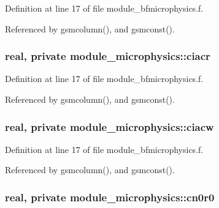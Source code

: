 Definition at line 17 of file module\+\_\+bfmicrophysics.\+f.



Referenced by gsmcolumn(), and gsmconst().

\subsubsection[{\texorpdfstring{ciacr}{ciacr}}]{\setlength{\rightskip}{0pt plus 5cm}real, private module\+\_\+microphysics\+::ciacr\hspace{0.3cm}{\ttfamily [private]}}\hypertarget{namespacemodule__microphysics_a1c6192a9baafa2b341b19628e00c19b5}{}\label{namespacemodule__microphysics_a1c6192a9baafa2b341b19628e00c19b5}


Definition at line 17 of file module\+\_\+bfmicrophysics.\+f.



Referenced by gsmcolumn(), and gsmconst().

\subsubsection[{\texorpdfstring{ciacw}{ciacw}}]{\setlength{\rightskip}{0pt plus 5cm}real, private module\+\_\+microphysics\+::ciacw\hspace{0.3cm}{\ttfamily [private]}}\hypertarget{namespacemodule__microphysics_a9e41f7e6287fe7ede81f17b9e041c09e}{}\label{namespacemodule__microphysics_a9e41f7e6287fe7ede81f17b9e041c09e}


Definition at line 17 of file module\+\_\+bfmicrophysics.\+f.



Referenced by gsmcolumn(), and gsmconst().

\subsubsection[{\texorpdfstring{cn0r0}{cn0r0}}]{\setlength{\rightskip}{0pt plus 5cm}real, private module\+\_\+microphysics\+::cn0r0\hspace{0.3cm}{\ttfamily [private]}}\hypertarget{namespacemodule__microphysics_a4b8b65e65be09b3e9a5cceca947fc408}{}\label{namespacemodule__microphysics_a4b8b65e65be09b3e9a5cceca947fc408}


